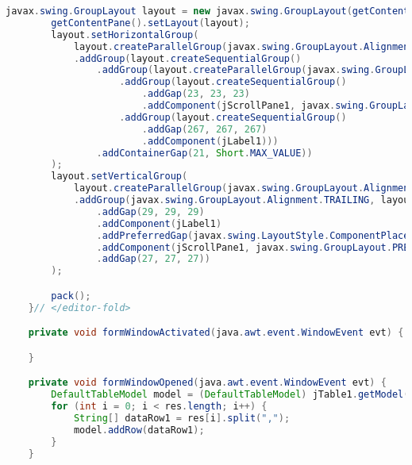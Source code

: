 \begin{lstlisting}[language=Java, caption=TampilanHasil.java]
        javax.swing.GroupLayout layout = new javax.swing.GroupLayout(getContentPane());
        getContentPane().setLayout(layout);
        layout.setHorizontalGroup(
            layout.createParallelGroup(javax.swing.GroupLayout.Alignment.LEADING)
            .addGroup(layout.createSequentialGroup()
                .addGroup(layout.createParallelGroup(javax.swing.GroupLayout.Alignment.LEADING)
                    .addGroup(layout.createSequentialGroup()
                        .addGap(23, 23, 23)
                        .addComponent(jScrollPane1, javax.swing.GroupLayout.PREFERRED_SIZE, 632, javax.swing.GroupLayout.PREFERRED_SIZE))
                    .addGroup(layout.createSequentialGroup()
                        .addGap(267, 267, 267)
                        .addComponent(jLabel1)))
                .addContainerGap(21, Short.MAX_VALUE))
        );
        layout.setVerticalGroup(
            layout.createParallelGroup(javax.swing.GroupLayout.Alignment.LEADING)
            .addGroup(javax.swing.GroupLayout.Alignment.TRAILING, layout.createSequentialGroup()
                .addGap(29, 29, 29)
                .addComponent(jLabel1)
                .addPreferredGap(javax.swing.LayoutStyle.ComponentPlacement.RELATED, 34, Short.MAX_VALUE)
                .addComponent(jScrollPane1, javax.swing.GroupLayout.PREFERRED_SIZE, javax.swing.GroupLayout.DEFAULT_SIZE, javax.swing.GroupLayout.PREFERRED_SIZE)
                .addGap(27, 27, 27))
        );

        pack();
    }// </editor-fold>                        

    private void formWindowActivated(java.awt.event.WindowEvent evt) {                                     

    }                                    

    private void formWindowOpened(java.awt.event.WindowEvent evt) {                                  
        DefaultTableModel model = (DefaultTableModel) jTable1.getModel();
        for (int i = 0; i < res.length; i++) {
            String[] dataRow1 = res[i].split(",");
            model.addRow(dataRow1);
        }
    }                                 


\end{lstlisting}
